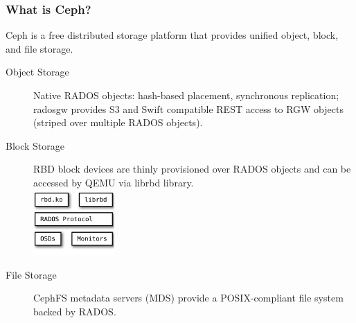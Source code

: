\documentclass[hyperref=unicode,utf8,xcolor=pst,aspectratio=169]{beamer}
\begin{document}
\begin{frame}
	\frametitle{What is Ceph?}
	Ceph is a free distributed storage platform that provides unified
	object, block, and file storage.

	\begin{description}
		\item[Object Storage] Native RADOS objects: hash-based
			placement, synchronous replication;\\
			radosgw provides S3 and Swift compatible REST access to
			RGW objects (striped over multiple RADOS objects).
		\item[Block Storage] RBD block devices are thinly
			provisioned over RADOS objects and can be
			accessed by QEMU via librbd library.\\
			\includegraphics[height=2.5cm]{ceph-rbd}
		\item[File Storage] CephFS metadata servers (MDS)
			provide a POSIX-compliant file system backed by RADOS.
	\end{description}
\end{frame}
\end{document}
